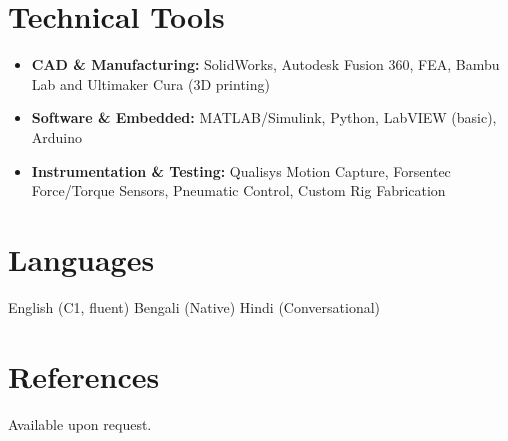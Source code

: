 \documentclass[10pt,a4paper]{article}
\begin{document}
\section{Technical Tools}
\begin{itemize}
\item \textbf{CAD \& Manufacturing:} SolidWorks, Autodesk Fusion 360, FEA, Bambu Lab and Ultimaker Cura (3D printing)
\item \textbf{Software \& Embedded:} MATLAB/Simulink, Python, LabVIEW (basic), Arduino
\item \textbf{Instrumentation \& Testing:} Qualisys Motion Capture, Forsentec Force/Torque Sensors, Pneumatic Control, Custom Rig Fabrication
\end{itemize}

\section{Languages}
English (C1, fluent) \textbar{} Bengali (Native) \textbar{} Hindi (Conversational)

\section{References}
Available upon request.
\end{document}

